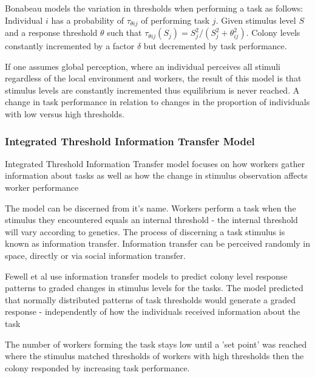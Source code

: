 Bonabeau models the variation in thresholds when performing a task as follows: Individual $i$ has a probability of $\tau_{\theta ij}$ of performing task $j$. Given stimulus level $S$ and a response threshold $\theta$ such that $\tau_{\theta ij}(S_j) = S_j^2/(S_j^2 + \theta_{ij}^2)$. Colony levels constantly incremented by a factor $\delta$ but decremented by task performance.

If one assumes global perception, where an individual perceives all stimuli regardless of the local environment and workers, the result of this model is that stimulus levels are constantly incremented thus equilibrium is never reached. A change in task performance in relation to changes in the proportion of individuals with low versus high thresholds. %





\subsubsection{Integrated Threshold Information Transfer Model}
Integrated Threshold Information Transfer model \cite{fewell1999division} focuses on how workers gather information about tasks as well as how the change in stimulus observation affects worker performance %

The model can be discerned from it's name. Workers perform a task when the stimulus they encountered equals an internal threshold - the internal threshold will vary according to genetics. The process of discerning a task stimulus is known as information transfer. Information transfer can be perceived randomly in space, directly or via social information transfer.

Fewell et al \cite{fewell1999division} use information transfer models to predict colony level response patterns to graded changes in stimulus levels for the tasks. The model predicted that normally distributed patterns of task thresholds would generate a graded response - independently of how the individuals received information about the task

The number of workers forming the task stays low until a 'set point' was reached where the stimulus matched thresholds of workers with high thresholds then the colony responded by increasing task performance.

